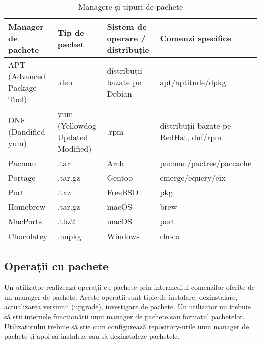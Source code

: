 \begin{table}[!htb]
  \caption{Managere și tipuri de pachete}
  \begin{center}
    \begin{tabular}{ p{} p{} p{} p{} }
      \toprule
        \textbf{Manager de pachete} &
        \textbf{Tip de pachet} &
        \textbf{Sistem de operare / distribuție} &
        \textbf{Comenzi specifice} \\
      \midrule
        APT (Advanced Package Tool) &
        .deb &
        distribuții bazate pe Debian &
        apt/aptitude/dpkg \\

        DNF (Dandified yum) &
        yum (Yellowdog Updated Modified) &
        .rpm &
        distribuții bazate pe RedHat, dnf/rpm \\

        Pacman &
        .tar &
        Arch &
        pacman/pactree/paccache \\

        Portage &
        .tar.gz &
        Gentoo &
        emerge/equery/eix \\

        Port &
        .txz &
        FreeBSD &
        pkg \\

        Homebrew &
        .tar.gz &
        macOS &
        brew \\

        MacPorts &
        .tbz2 &
        macOS &
        port \\

        Chocolatey &
        .nupkg &
        Windows &
        choco \\

      \bottomrule
    \end{tabular}
    \label{tab:package:types}
  \end{center}
\end{table}

\subsection{Operații cu pachete}
\label{sec:package:ops}

Un utilizator realizează operații cu pachete prin intermediul comenzilor oferite de un manager de pachete. Aceste operații sunt tipic de instalare, dezinstalare, actualizarea versiunii (upgrade), investigare de pachete. Un utilizator nu trebuie să știi internele funcționării unui manager de pachete sau formatul pachetelor. Utilizatorului trebuie să știe cum configurează repository-urile unui manager de pachete și apoi să instaleze sau să dezinstaleze pachetele.

